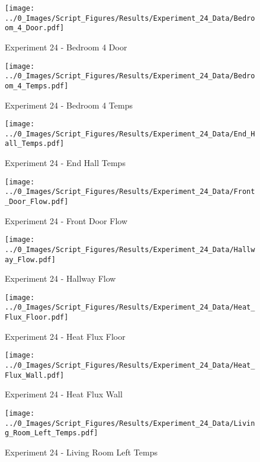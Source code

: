 	\clearpage

	\begin{figure}[H]
		\centering
		\texttt{[image: ../0\_Images/Script\_Figures/Results/Experiment\_24\_Data/Bedroom\_4\_Door.pdf]}
		\caption[]{Experiment 24 - Bedroom 4 Door}
	\end{figure}
 

	\begin{figure}[H]
		\centering
		\texttt{[image: ../0\_Images/Script\_Figures/Results/Experiment\_24\_Data/Bedroom\_4\_Temps.pdf]}
		\caption[]{Experiment 24 - Bedroom 4 Temps}
	\end{figure}
 
	\clearpage

	\begin{figure}[H]
		\centering
		\texttt{[image: ../0\_Images/Script\_Figures/Results/Experiment\_24\_Data/End\_Hall\_Temps.pdf]}
		\caption[]{Experiment 24 - End Hall Temps}
	\end{figure}
 

	\begin{figure}[H]
		\centering
		\texttt{[image: ../0\_Images/Script\_Figures/Results/Experiment\_24\_Data/Front\_Door\_Flow.pdf]}
		\caption[]{Experiment 24 - Front Door Flow}
	\end{figure}
 
	\clearpage

	\begin{figure}[H]
		\centering
		\texttt{[image: ../0\_Images/Script\_Figures/Results/Experiment\_24\_Data/Hallway\_Flow.pdf]}
		\caption[]{Experiment 24 - Hallway Flow}
	\end{figure}
 

	\begin{figure}[H]
		\centering
		\texttt{[image: ../0\_Images/Script\_Figures/Results/Experiment\_24\_Data/Heat\_Flux\_Floor.pdf]}
		\caption[]{Experiment 24 - Heat Flux Floor}
	\end{figure}
 
	\clearpage

	\begin{figure}[H]
		\centering
		\texttt{[image: ../0\_Images/Script\_Figures/Results/Experiment\_24\_Data/Heat\_Flux\_Wall.pdf]}
		\caption[]{Experiment 24 - Heat Flux Wall}
	\end{figure}
 

	\begin{figure}[H]
		\centering
		\texttt{[image: ../0\_Images/Script\_Figures/Results/Experiment\_24\_Data/Living\_Room\_Left\_Temps.pdf]}
		\caption[]{Experiment 24 - Living Room Left Temps}
	\end{figure}
 
